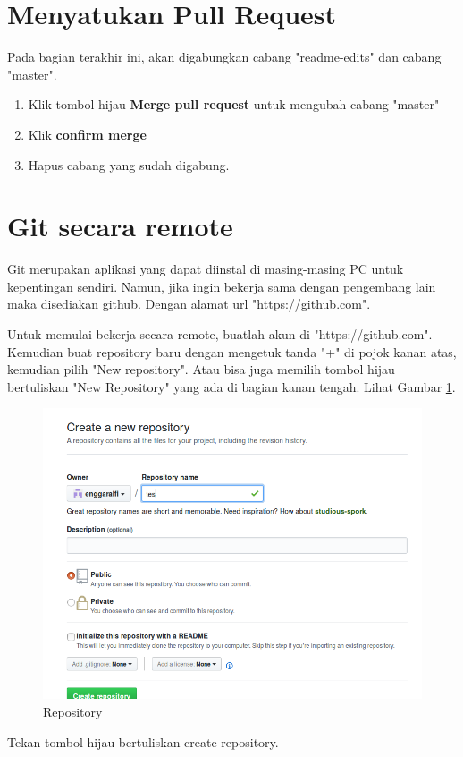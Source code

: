\documentclass[12pt,a4paper]{article}
\begin{document}
\section{Menyatukan Pull Request}
Pada bagian terakhir ini, akan digabungkan cabang "readme-edits" dan cabang "master".
\begin{enumerate}
\item Klik tombol hijau \textbf{Merge pull request} untuk mengubah cabang "master"
\item Klik \textbf{confirm merge}
\item Hapus cabang yang sudah digabung.
\end{enumerate}

\section{Git secara remote}
Git merupakan aplikasi yang dapat diinstal di masing-masing PC untuk kepentingan sendiri. Namun, jika ingin bekerja sama dengan pengembang lain maka disediakan github. Dengan alamat url "https://github.com". 

Untuk memulai bekerja secara remote, buatlah akun di "https://github.com". Kemudian buat repository baru dengan mengetuk tanda "+" di pojok kanan atas, kemudian pilih "New repository". Atau bisa juga memilih tombol hijau bertuliskan "New Repository" yang ada di bagian kanan tengah. Lihat Gambar \ref{fig:repobaru}.

\begin{figure}[h!]
\includegraphics[scale=0.5]{image/newrepo.png} 
\caption{Repository}
\label{fig:repobaru}
\end{figure}
Tekan tombol hijau bertuliskan create repository.
\end{document}
